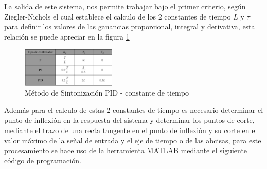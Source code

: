 \documentclass[conference]{IEEEtran}
\begin{document}
	La salida de este sistema, nos permite trabajar bajo el primer criterio, según Ziegler-Nichols el cual establece el calculo de los 2 constantes de tiempo $L$ y $\tau$ para definir los valores de las ganancias proporcional, integral y derivativa, esta relación se puede apreciar en la figura \ref{fig:pid-reglas-1}
	
	\begin{figure}[h]
		\centering
		\includegraphics[width=0.4\textwidth]{media/pid-reglas-1}
		\caption{Método de Sintonización PID - constante de tiempo}
		\label{fig:pid-reglas-1}
	\end{figure}
	
	Además para el calculo de estas 2 constantes de tiempo es necesario determinar el punto de inflexión en la respuesta del sistema y determinar los puntos de corte, mediante el trazo de una recta tangente en el punto de inflexión y su corte en el valor máximo de la señal de entrada y el eje de tiempo o de las abcisas, para este procesamiento se hace uso de la herramienta MATLAB mediante el siguiente código de programación.
	
	
\end{document}
